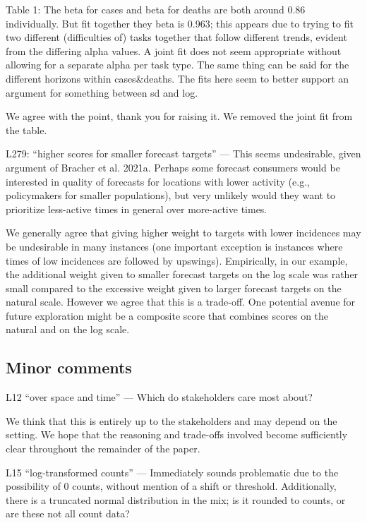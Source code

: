 \documentclass{article}
\newcommand{\black}{\color{black}}
\newcommand{\blue}{\color{blue}}
\begin{document}
\blue
Table 1: The beta for cases and beta for deaths are both around 0.86 individually. But fit together they beta is 0.963; this appears due to trying to fit two different (difficulties of) tasks together that follow different trends, evident from the differing alpha values. A joint fit does not seem appropriate without allowing for a separate alpha per task type. The same thing can be said for the different horizons within cases\&deaths. The fits here seem to better support an argument for something between sd and log.

\black
We agree with the point, thank you for raising it. We removed the joint fit from the table. 

\blue
L279: “higher scores for smaller forecast targets” — This seems undesirable, given argument of Bracher et al. 2021a. Perhaps some forecast consumers would be interested in quality of forecasts for locations with lower activity (e.g., policymakers for smaller populations), but very unlikely would they want to prioritize less-active times in general over more-active times.  

\black 
We generally agree that giving higher weight to targets with lower incidences may be undesirable in many instances (one important exception is instances where times of low incidences are followed by upswings). Empirically, in our example, the additional weight given to smaller forecast targets on the log scale was rather small compared to the excessive weight given to larger forecast targets on the natural scale. However we agree that this is a trade-off. One potential avenue for future exploration might be a composite score that combines scores on the natural and on the log scale. 

\subsection{Minor comments}

\blue
L12 “over space and time” — Which do stakeholders care most about?

\black
We think that this is entirely up to the stakeholders and may depend on the setting. We hope that the reasoning and trade-offs involved become sufficiently clear throughout the remainder of the paper. 

\blue
L15 “log-transformed counts” — Immediately sounds problematic due to the possibility of 0 counts, without mention of a shift or threshold. Additionally, there is a truncated normal distribution in the mix; is it rounded to counts, or are these not all count data?
\end{document}
